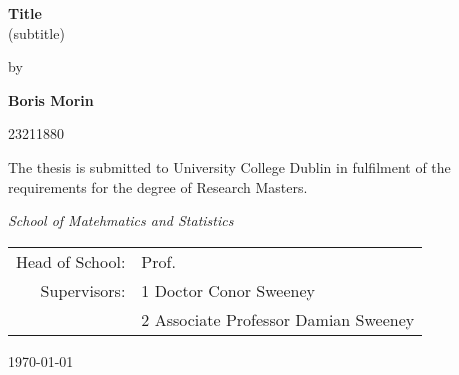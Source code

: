 \begin{titlepage}%
\begin{center}

\Huge
\textbf{Title}\\
\small
(subtitle)
\vfill

\Large
by

\vfill

\textbf{Boris Morin}

\small
23211880

\vfill

\Large
The thesis is submitted to University College Dublin in fulfilment of the requirements for the
degree of Research Masters.

\vfill

\emph{School of Matehmatics and Statistics}

\vfill

\normalsize

\begin{tabular}{rl}
Head of School: & Prof.\ \\
Supervisors: & 1 Doctor Conor Sweeney\\
            & 2 Associate Professor Damian Sweeney
\end{tabular}

\vfill

\Large
\today

\end{center}
\end{titlepage}